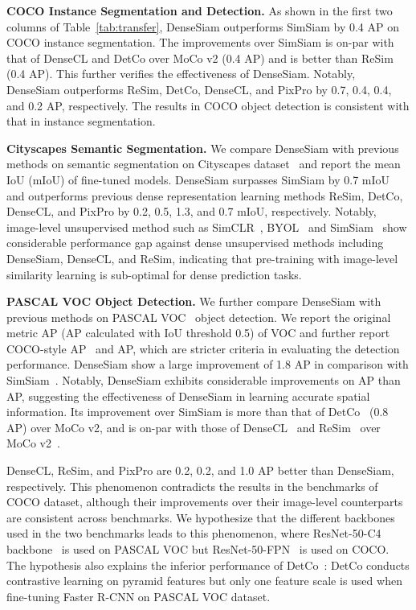 \documentclass[runningheads]{llncs}
\newcommand{\myparagraph}[1]{{\noindent\bf #1}}
\begin{document}
\myparagraph{COCO Instance Segmentation and Detection.}
As shown in the first two columns of Table~\ref{tab:transfer},
DenseSiam outperforms SimSiam by 0.4 AP on COCO instance segmentation.
The improvements over SimSiam is on-par with that of DenseCL and DetCo over MoCo v2 (0.4  AP)
and is better than ReSim (0.4  AP).
This further verifies the effectiveness of DenseSiam.
Notably, DenseSiam outperforms ReSim, DetCo, DenseCL, and PixPro by 0.7, 0.4, 0.4, and 0.2 AP, respectively.
The results in COCO object detection is consistent with that in instance segmentation.

\myparagraph{Cityscapes Semantic Segmentation.}
We compare DenseSiam with previous methods on semantic segmentation on Cityscapes dataset~\cite{cityscapes} and report the mean IoU (mIoU) of fine-tuned models.
DenseSiam surpasses SimSiam by 0.7 mIoU and
outperforms previous dense representation learning methods ReSim, DetCo, DenseCL, and PixPro by 0.2, 0.5, 1.3, and 0.7 mIoU, respectively.
Notably, image-level unsupervised method such as SimCLR~\cite{simclr}, BYOL~\cite{byol} and SimSiam~\cite{simsiam} show considerable performance gap against 
dense unsupervised methods including DenseSiam, DenseCL, and ReSim, indicating that pre-training with image-level similarity learning is sub-optimal for dense prediction tasks.

\myparagraph{PASCAL VOC Object Detection.}
We further compare DenseSiam with previous methods on PASCAL VOC~\cite{voc} object detection.
We report the original metric AP (AP calculated with IoU threshold 0.5) of VOC and further report COCO-style AP~\cite{wu2019detectron2} and AP,
which are stricter criteria in evaluating the detection performance.
DenseSiam show a large improvement of 1.8 AP in comparison with SimSiam~\cite{simsiam}.
Notably, DenseSiam exhibits considerable improvements on AP than AP,
suggesting the effectiveness of DenseSiam in learning accurate spatial information.
Its improvement over SimSiam is more than that of DetCo~\cite{detco} (0.8 AP) over MoCo v2, and is on-par with those of DenseCL~\cite{densecl} and ReSim~\cite{resim} over MoCo v2~\cite{mocov2}.

DenseCL, ReSim, and PixPro are 0.2, 0.2, and 1.0 AP better than DenseSiam, respectively.
This phenomenon contradicts the results in the benchmarks of COCO dataset,
although their improvements over their image-level counterparts are consistent across benchmarks.
We hypothesize that the different backbones used in the two benchmarks leads to this phenomenon, where ResNet-50-C4 backbone~\cite{ren2015faster} is used on PASCAL VOC but ResNet-50-FPN~\cite{fpn} is used on COCO.
The hypothesis also explains the inferior performance of DetCo~\cite{detco}:
DetCo conducts contrastive learning on pyramid features but only one feature scale is used when fine-tuning Faster R-CNN on PASCAL VOC dataset.
\end{document}
